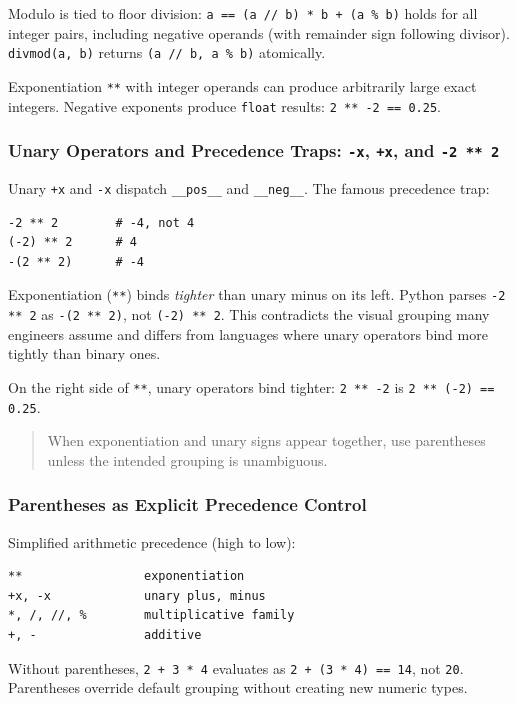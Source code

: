Modulo is tied to floor division: \texttt{a == (a // b) * b + (a \% b)} holds for all integer pairs, including negative operands (with remainder sign following divisor). \texttt{divmod(a, b)} returns \texttt{(a // b, a \% b)} atomically.

Exponentiation \texttt{**} with integer operands can produce arbitrarily large exact integers. Negative exponents produce \texttt{float} results: \texttt{2 ** -2 == 0.25}.

\subsubsection{Unary Operators and Precedence Traps: \texttt{-x}, \texttt{+x}, and \texttt{-2 ** 2}}

Unary \texttt{+x} and \texttt{-x} dispatch \texttt{\_\_pos\_\_} and \texttt{\_\_neg\_\_}. The famous precedence trap:

\begin{verbatim}
-2 ** 2        # -4, not 4
(-2) ** 2      # 4
-(2 ** 2)      # -4
\end{verbatim}

Exponentiation (\texttt{**}) binds \emph{tighter} than unary minus on its left. Python parses \texttt{-2 ** 2} as \texttt{-(2 ** 2)}, not \texttt{(-2) ** 2}. This contradicts the visual grouping many engineers assume and differs from languages where unary operators bind more tightly than binary ones.

On the right side of \texttt{**}, unary operators bind tighter: \texttt{2 ** -2} is \texttt{2 ** (-2) == 0.25}.

\begin{quote}
When exponentiation and unary signs appear together, use parentheses unless the intended grouping is unambiguous.
\end{quote}

\subsubsection{Parentheses as Explicit Precedence Control}

Simplified arithmetic precedence (high to low):

\begin{verbatim}
**                 exponentiation
+x, -x             unary plus, minus
*, /, //, %        multiplicative family
+, -               additive
\end{verbatim}

Without parentheses, \texttt{2 + 3 * 4} evaluates as \texttt{2 + (3 * 4) == 14}, not \texttt{20}. Parentheses override default grouping without creating new numeric types.

